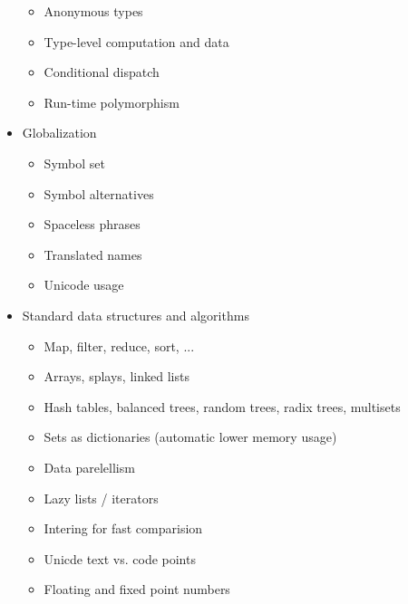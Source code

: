 \begin{itemize}
\begin{itemize}
  \item Anonymous types

  \item Type-level computation and data

  \item Conditional dispatch

  \item Run-time polymorphism

  \end{itemize}

\item Globalization

  \begin{itemize}

  \item Symbol set

  \item Symbol alternatives

  \item Spaceless phrases

  \item Translated names

  \item Unicode usage

  \end{itemize}

\item Standard data structures and algorithms

  \begin{itemize}

  \item Map, filter, reduce, sort, ...

  \item Arrays, splays, linked lists

  \item Hash tables, balanced trees, random trees, radix trees, multisets

  \item Sets as dictionaries (automatic lower memory usage)

  \item Data parelellism

  \item Lazy lists / iterators

  \item Intering for fast comparision

  \item Unicde text vs. code points

  \item Floating and fixed point numbers


\end{itemize}
\end{itemize}
